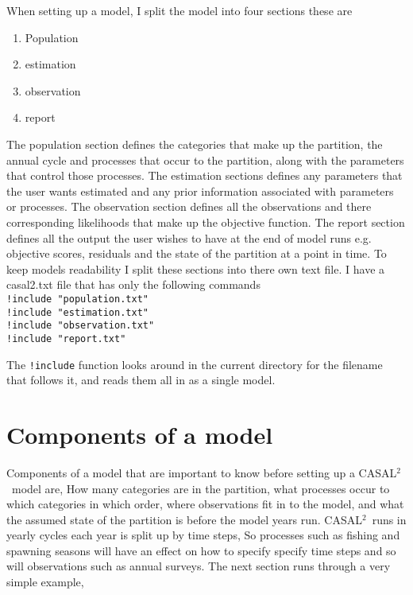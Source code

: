 \documentclass[12pt]{article}
\newcommand{\CAS}{CASAL$^2$}
\begin{document}
When setting up a model, I split the model into four sections these are

\begin{enumerate}
\item Population
\item estimation
\item observation
\item report
\end{enumerate}

The population section defines the categories that make up the partition, the annual cycle and processes that occur to the partition, along with the parameters that control those processes. The estimation sections defines any parameters that the user wants estimated and any prior information associated with parameters or processes. The observation section defines all the observations and there corresponding likelihoods that make up the objective function. The report section defines all the output the user wishes to have at the end of model runs e.g. objective scores, residuals and the state of the partition at a point in time. To keep models readability I split these sections into there own text file. I have a casal2.txt file that has only the following commands\\
\texttt{!include "population.txt"}\\
\texttt{!include "estimation.txt"}\\
\texttt{!include "observation.txt"}\\
\texttt{!include "report.txt"}

The \texttt{!include} function looks around in the current directory for the filename that follows it, and reads them all in as a single model.

\section{Components of a model}\label{Sec:comp}
Components of a model that are important to know before setting up a \CAS\ model are, How many categories are in the partition, what processes occur to which categories in which order, where observations fit in to the model, and what the assumed state of the partition is before the model years run. \CAS\ runs in yearly cycles each year is split up by time steps, So processes such as fishing and spawning seasons will have an effect on how to specify specify time steps and so will observations such as annual surveys. The next section runs through a very simple example,
\end{document}
